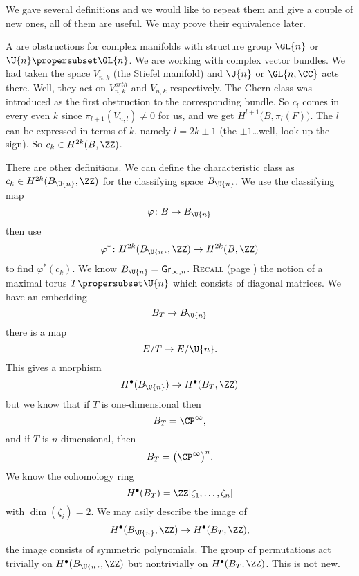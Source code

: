 We gave several definitions and we would like to repeat them and
give a couple of new ones, all of them are useful. We may prove
their equivalence later.

A  are obstructions for complex manifolds
with structure group $\GL{n}$ or $\U{n}\propersubset\GL{n}$. We are
working with complex vector bundles. We had taken the space
$V_{n,k}$ (the Stiefel manifold) and $\U{n}$ or $\GL{n,\CC}$
acts there. Well, they act on $V^{orth}_{n,k}$ and $V_{n,k}$
respectively. The Chern class was introduced as the first
obstruction to the corresponding bundle. So $c_{l}$ comes in
every even $k$ since $\pi_{l+1}(V_{n,l})\not=0$ for us, and we
get $H^{l+1}\bigl(B,\pi_{l}(F)\bigr)$. The $l$ can be expressed
in terms of $k$, namely $l=2k\pm1$ (the $\pm1$\dots well, look up
the sign). So $c_{k}\in H^{2k}(B,\ZZ)$.

There are other definitions. We can define the characteristic
class as $c_{k}\in H^{2k}(B_{\U{n}},\ZZ)$ for the classifying
space $B_{\U{n}}$. We use the classifying map 
\begin{equation}
\varphi\colon B\to B_{\U{n}}
\end{equation}
then use
\begin{equation}
\varphi^{*}\colon H^{2k}(B_{\U{n}},\ZZ)\to H^{2k}(B,\ZZ)
\end{equation}
to find $\varphi^{*}(c_{k})$. We know
$B_{\U{n}}=\Gr_{\infty,n}$. \hyperref[defn:maximalTorus]{\textsc{Recall}}
(page \pageref{defn:maximalTorus}) the notion of a maximal torus
$T\propersubset\U{n}$ which consists of diagonal matrices. We
have an embedding
\begin{equation}
B_{T}\to B_{\U{n}}
\end{equation}
there is a map
\begin{equation}
E/T\to E/\U{n}.
\end{equation}
This gives a morphism
\begin{equation}
H^{\bullet}(B_{\U{n}})\to H^{\bullet}(B_{T},\ZZ)
\end{equation}
but we know that if $T$ is one-dimensional then
\begin{equation}
B_{T}=\CP^{\infty},
\end{equation}
and if $T$ is $n$-dimensional, then
\begin{equation}
B_{T}=\bigl(\CP^{\infty}\bigr)^{n}.
\end{equation}
We know the cohomology ring
\begin{equation}
H^{\bullet}(B_{T})=\ZZ[\zeta_{1},\dots,\zeta_{n}]
\end{equation}
with $\dim(\zeta_{i})=2$. We may asily describe the image of
\begin{equation}
H^{\bullet}(B_{\U{n}},\ZZ)\to H^{\bullet}(B_{T},\ZZ),
\end{equation}
the image consists of symmetric polynomials. The group of
permutations act trivially on $H^{\bullet}(B_{\U{n}},\ZZ)$ but
nontrivially on $H^{\bullet}(B_{T},\ZZ)$. This is not new.

